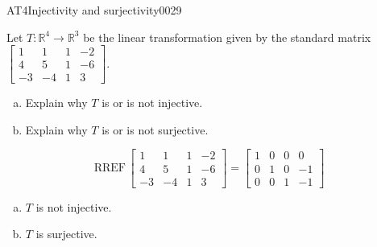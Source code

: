 \begin{exercise}{AT4}{Injectivity and surjectivity}{0029} 
\begin{exerciseStatement} 

 Let \(T:\mathbb{R}^4 \to \mathbb{R}^3\) be the linear transformation given by the standard matrix \(\left[\begin{array}{cccc}
1 & 1 & 1 & -2 \\
4 & 5 & 1 & -6 \\
-3 & -4 & 1 & 3
\end{array}\right]\). 

 

\begin{enumerate}[(a)]
\item 

Explain why \(T\) is or is not injective.


\item 

Explain why \(T\) is or is not surjective.


\end{enumerate}

     \end{exerciseStatement}
 \begin{exerciseAnswer} 

\[\mathrm{RREF}\,\left[\begin{array}{cccc}
1 & 1 & 1 & -2 \\
4 & 5 & 1 & -6 \\
-3 & -4 & 1 & 3
\end{array}\right]=\left[\begin{array}{cccc}
1 & 0 & 0 & 0 \\
0 & 1 & 0 & -1 \\
0 & 0 & 1 & -1
\end{array}\right]\]

 

\begin{enumerate}[(a)]
\item  

\(T\) is not injective.

 
\item  

\(T\) is surjective.

 
\end{enumerate}

     \end{exerciseAnswer}
 \end{exercise}




